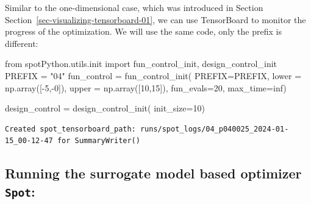 \documentclass[
  letterpaper,
  DIV=11,
  numbers=noendperiod]{scrreprt}
\newenvironment{Shaded}{\begin{snugshade}}{\end{snugshade}}
\newcommand{\DecValTok}[1]{\textcolor[rgb]{0.68,0.00,0.00}{#1}}
\newcommand{\ImportTok}[1]{\textcolor[rgb]{0.00,0.46,0.62}{#1}}
\newcommand{\NormalTok}[1]{\textcolor[rgb]{0.00,0.23,0.31}{#1}}
\newcommand{\OperatorTok}[1]{\textcolor[rgb]{0.37,0.37,0.37}{#1}}
\newcommand{\StringTok}[1]{\textcolor[rgb]{0.13,0.47,0.30}{#1}}
\begin{document}
\begin{tcolorbox}[enhanced jigsaw, rightrule=.15mm, coltitle=black, title=\textcolor{quarto-callout-note-color}{\faInfo}\hspace{0.5em}{TensorBoard}, opacitybacktitle=0.6, bottomrule=.15mm, opacityback=0, left=2mm, colback=white, leftrule=.75mm, colframe=quarto-callout-note-color-frame, colbacktitle=quarto-callout-note-color!10!white, toprule=.15mm, toptitle=1mm, bottomtitle=1mm, titlerule=0mm, breakable, arc=.35mm]

Similar to the one-dimensional case, which was introduced in Section
Section~\ref{sec-visualizing-tensorboard-01}, we can use TensorBoard to
monitor the progress of the optimization. We will use the same code,
only the prefix is different:

\begin{Shaded}
\begin{Highlighting}[]
\ImportTok{from}\NormalTok{ spotPython.utils.init }\ImportTok{import}\NormalTok{ fun\_control\_init, design\_control\_init}
\NormalTok{PREFIX }\OperatorTok{=} \StringTok{"04"}
\NormalTok{fun\_control }\OperatorTok{=}\NormalTok{ fun\_control\_init(}
\NormalTok{    PREFIX}\OperatorTok{=}\NormalTok{PREFIX,}
\NormalTok{    lower }\OperatorTok{=}\NormalTok{ np.array([}\OperatorTok{{-}}\DecValTok{5}\NormalTok{,}\OperatorTok{{-}}\DecValTok{0}\NormalTok{]),}
\NormalTok{    upper }\OperatorTok{=}\NormalTok{ np.array([}\DecValTok{10}\NormalTok{,}\DecValTok{15}\NormalTok{]),}
\NormalTok{    fun\_evals}\OperatorTok{=}\DecValTok{20}\NormalTok{,}
\NormalTok{    max\_time}\OperatorTok{=}\NormalTok{inf)}

\NormalTok{design\_control }\OperatorTok{=}\NormalTok{ design\_control\_init(}
\NormalTok{    init\_size}\OperatorTok{=}\DecValTok{10}\NormalTok{)}
\end{Highlighting}
\end{Shaded}

\begin{verbatim}
Created spot_tensorboard_path: runs/spot_logs/04_p040025_2024-01-15_00-12-47 for SummaryWriter()
\end{verbatim}

\end{tcolorbox}

\subsection{\texorpdfstring{Running the surrogate model based optimizer
\texttt{Spot}:}{Running the surrogate model based optimizer Spot:}}\label{running-the-surrogate-model-based-optimizer-spot}
\end{document}
